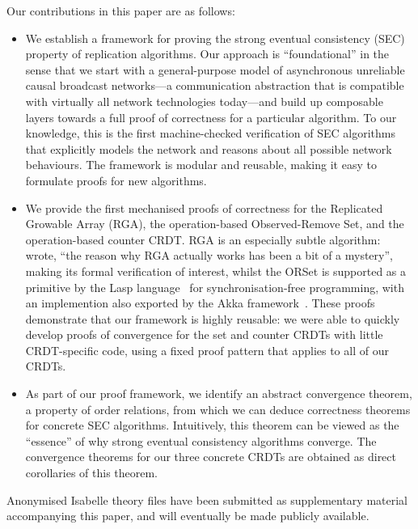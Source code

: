 \documentclass[acmlarge,review,anonymous]{acmart}
\begin{document}
Our contributions in this paper are as follows:
\begin{itemize}
\item
We establish a framework for proving the strong eventual consistency (SEC) property of replication algorithms.
Our approach is ``foundational'' in the sense that we start with a general-purpose model of asynchronous unreliable causal broadcast networks---a communication abstraction that is compatible with virtually all network technologies today---and build up composable layers towards a full proof of correctness for a particular algorithm.
To our knowledge, this is the first machine-checked verification of SEC algorithms that explicitly models the network and reasons about all possible network behaviours.
The framework is modular and reusable, making it easy to formulate proofs for new algorithms.
\item
We provide the first mechanised proofs of correctness for the Replicated Growable Array (RGA), the operation-based Observed-Remove Set, and the operation-based counter CRDT.
RGA is an especially subtle algorithm: \citet{Attiya:2016kh} wrote, ``the reason why RGA actually works has been a bit of a mystery'', making its formal verification of interest, whilst the ORSet is supported as a primitive by the Lasp language~\cite{DBLP:conf/ppdp/MeiklejohnR15} for synchronisation-free programming, with an implemention also exported by the Akka framework~\cite{akka}.
These proofs demonstrate that our framework is highly reusable: we were able to quickly develop proofs of convergence for the set and counter CRDTs with little CRDT-specific code, using a fixed proof pattern that applies to all of our CRDTs.
\item
As part of our proof framework, we identify an abstract convergence theorem, a property of order relations, from which we can deduce correctness theorems for concrete SEC algorithms.
Intuitively, this theorem can be viewed as the ``essence'' of why strong eventual consistency algorithms converge.
The convergence theorems for our three concrete CRDTs are obtained as direct corollaries of this theorem.
\end{itemize}

Anonymised Isabelle theory files have been submitted as supplementary material accompanying this paper, and will eventually be made publicly available.








\end{document}
